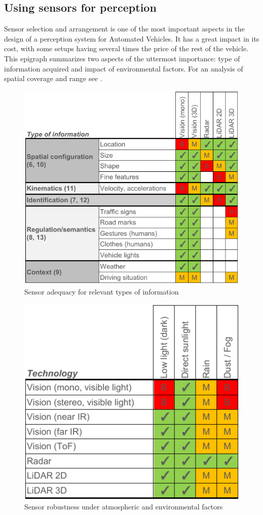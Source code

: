 \subsection{Using sensors for perception}
\label{sec:03-e-sensors-for-perception}

Sensor selection and arrangement is one of the most important aspects in the 
design of a perception system for Automated Vehicles. It has a great impact
in its cost, with some setups having several times the price of the rest of 
the vehicle. 
This epigraph summarizes two aspects of the uttermost importance: type of 
information acquired and impact of environmental factors. For an analysis of
spatial coverage and range see \cite{Schoettle2017}.

\begin{figure}%
    \centering
    \includegraphics[width=0.95\linewidth]{"img/information_types_sensors"}
    \caption{Sensor adequacy for relevant types of information}
    \label{fig:information_vs_sensors}
\end{figure}
\begin{figure}[b]
    \centering
    \includegraphics[width=0.68\linewidth]{"img/sensors_atmospheric_conditions"}
    \caption{Sensor robustness under atmospheric and environmental factors}
    \label{fig:sensors-environ}
\end{figure}

